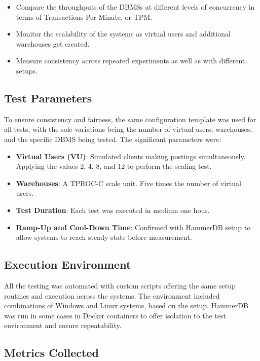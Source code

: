 \begin{itemize}
    \setlength\itemsep{0.1em}
    \item Compare the throughputs of the DBMSs at different levels of concurrency in terms of Transactions Per Minute, or TPM.
    \item Monitor the scalability of the systems as virtual users and additional warehouses get created.
    \item Measure consistency across repeated experiments as well as with different setups.
\end{itemize}

\subsection{Test Parameters}

To ensure consistency and fairness, the same configuration template was used for all tests, with the sole variations being the number of virtual users, warehouses, and the specific DBMS being tested. The significant parameters were:

\begin{itemize}
    \setlength\itemsep{0.1em}
    \item \textbf{Virtual Users (VU)}: Simulated clients making postings simultaneously. Applying the values 2, 4, 8, and 12 to perform the scaling test.
    \item \textbf{Warehouses}: A TPROC-C scale unit. Five times the number of virtual users.
    \item \textbf{Test Duration}: Each test was executed in medium one hour.
    \item \textbf{Ramp-Up and Cool-Down Time}: Confirmed with HammerDB setup to allow systems to reach steady state before measurement.
\end{itemize}

\subsection{Execution Environment}

All the testing was automated with custom scripts offering the same setup routines and execution across the systems. The environment included combinations of Windows and Linux systems, based on the setup. HammerDB was run in some cases in Docker containers to offer isolation to the test environment and ensure repeatability.

\subsection{Metrics Collected}

